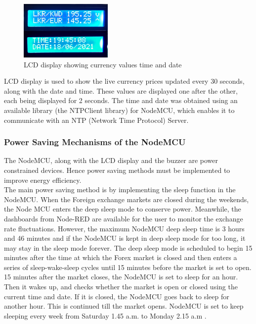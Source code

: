 \begin{figure}[H]
    \centering
      \includegraphics[width=0.4\textwidth]{images/lcd.png}
    \caption{LCD display showing currency values time and date}
    \label{fig:lcd}
\end{figure}


LCD display is used to show the live currency prices updated every 30 seconds, along with the date and time. These values are displayed one after the other, each being displayed for 2 seconds. The time and date was obtained using an available library (the NTPClient library) for NodeMCU, which enables it to communicate with an NTP (Network Time Protocol) Server.\\

\subsubsection{Power Saving Mechanisms of the NodeMCU}

The NodeMCU, along with the LCD display and the buzzer are power constrained devices. Hence power saving methods must be implemented to improve energy efficiency.\\

The main power saving method is by implementing the sleep function in the NodeMCU. When the Foreign exchange markets are closed during the weekends, the Node MCU enters the deep sleep mode to conserve power. Meanwhile, the dashboards from Node-RED are available for the user to monitor the exchange rate fluctuations. However, the maximum NodeMCU deep sleep time is 3 hours and 46 minutes \cite{deepsleep} and if the NodeMCU is kept in deep sleep mode for too long, it may stay in the sleep mode forever. The deep sleep mode is scheduled to begin 15 minutes after the time at which the Forex market is closed and then enters a series of sleep-wake-sleep cycles until 15 minutes before the market is set to open.\\

15 minutes after the market closes, the NodeMCU is set to sleep for an hour. Then it wakes up, and checks whether the market is open or closed using the current time and date. If it is closed, the NodeMCU goes back to sleep for another hour. This is continued till the market opens. NodeMCU is set to keep sleeping every week from Saturday 1.45 a.m. to Monday 2.15 a.m \cite{hours}.\\

